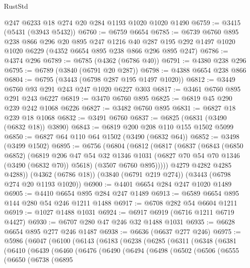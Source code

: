 \begin{lexlean}{RustStd}
\begin{coremodule}
    @247
    @6233
    @18
    @274
    @20
    @284
    @1193
    @1020
    @1020
    @1490
@6759 := @3415 (@5431 (@3943 @5432))
@6760 := @6759 @6654
@6785 := @6739
    @6760
    @895
    @238
    @866
    @296
    @20
    @895
    @247
    @1216
    @40
    @287
    @195
    @292
    @1497
    @1020
    @1020
    @6229
    (@4352 @6654 @895 @238 @866 @296 @895 @247)
@6786 := @4374 @296
@6789 := @6785 (@4362 (@6786 @40))
@6791 := @4380 @238 @296
@6795 := @6789 (@3840 (@6791 @20 @287))
@6798 := @4388 @6654 @238 @866
@6804 := @6795 (@3443 (@6798 @287 @195 @1497 @1020))
@6812 := @3449 @6760 @93 @291 @243 @247 @1020 @6227 @303
@6817 := @3461 @6760 @895 @291 @243 @6227
@6819 := @3470 @6760 @895
@6825 := @6819 @45 @290 @239 @242 @1068 @6226
@6827 := @3482 @6760 @895
@6831 := @6827 @18 @239 @18 @1068
@6832 := @3491 @6760
@6837 := @6825 (@6831 (@3490 (@6832 @18)) @3890)
@6843 := @6819 @200 @208 @110 @155 @1502 @5099
@6850 := @6827 @64 @110 @64 @1502 (@3490 (@6832 @64))
@6852 := @3498 (@3499 @1502)
@6895 := @6756
    (@6804
      (@6812
        (@6817
          (@6837
            (@6843
              (@6850 @6852)
              (@6819
                @206
                @47
                @54
                @32
                @1346
                @1031
                (@6827 @70 @54 @70 @1346 (@3490 (@6832 @70)) @5618)
                (@3507 @6760 @895)))))
        @4279
        @4282
        @4285
        @4288))
    (@4362 (@6786 @18))
    (@3840 (@6791 @219 @274))
    (@3443 (@6798 @274 @20 @1193 @1020))
@6900 := @4401 @6654 @284 @247 @1020 @1489
@6905 := @4410 @6654 @895 @284 @247 @1489
@6913 := @6589 @6654 @895 @144 @280 @54 @246 @1211 @1488
@6917 := @6708 @282 @54 @6604 @1211
@6919 := @1027 @1488 @1031
@6924 := @6917 @6919 (@6716 @1211 @6719 @4427)
@6930 := @6707 @280 @47 @246 @32 @1488 @1031
@6935 := @6628 @6654 @895 @277 @246 @1487
@6938 := @6636 (@6637 @277 @246)
@6975 := @5986
    (@6047
      (@6100
        (@6143
          (@6183
            (@6238
              (@6285
                (@6311
                  (@6348
                    (@6381
                      (@6410
                        (@6439
                          (@6460
                            (@6476
                              (@6490
                                (@6494
                                  (@6498
                                    (@6502
                                      (@6506
                                        (@6555
                                          (@6650
                                            (@6738
                                              (@6895

\end{coremodule}
\end{lexlean}
